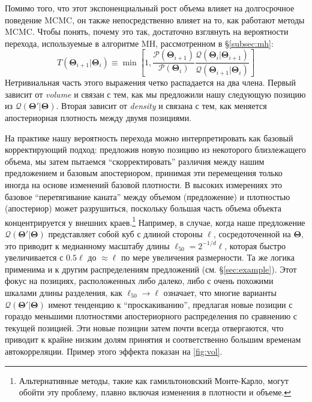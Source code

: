 \documentclass[12pt, titlepage]{article}
\newcommand{\params}{\ensuremath{\boldsymbol\Theta}}
\newcommand{\posterior}{\ensuremath{\mathcal{P}}}
\newcommand{\proposal}{\ensuremath{\mathcal{Q}}}
\begin{document}
Помимо того, что этот экспоненциальный рост объема влияет на долгосрочное поведение MCMC, он также непосредственно влияет на то, как работают методы MCMC. Чтобы понять, почему это так, достаточно взглянуть на вероятности перехода, используемые в алгоритме MH, рассмотренном в \S\ref{subsec:mh}:
\begin{equation*}
    T(\params_{i+1}|\params_i)
    \equiv \min\left[1, \frac{\posterior(\params_{i+1})}{\posterior(\params_i)}
    \frac{\proposal(\params_i|\params_{i+1})}{\proposal(\params_{i+1}|\params_i)}
    \right]
\end{equation*}
Нетривиальная часть этого выражения четко распадается на два члена. Первый зависит от \textit{volume} и связан с тем, как мы предложили нашу следующую позицию из $\proposal(\params'|\params)$. Вторая зависит от \textit{density} и связана с тем, как меняется апостериорная плотность между двумя позициями.

На практике нашу вероятность перехода можно интерпретировать как базовый корректирующий подход: предложив новую позицию из некоторого близлежащего объема, мы затем пытаемся ``скорректировать'' различия между нашим предложением и базовым апостериором, принимая эти перемещения только иногда на основе изменений базовой плотности. В высоких измерениях это базовое ``перетягивание каната'' между объемом (предложение) и плотностью (апостериор) может разрушиться, поскольку большая часть объема объекта концентрируется у внешних краев.\footnote{Альтернативные методы, такие как гамильтоновский Монте-Карло,\citep{neal12} могут обойти эту проблему, плавно включая изменения в плотности и объеме.} Например, в случае, когда наше предложение $\proposal(\params'|\params)$ представляет собой куб с длиной стороны $\ell$, сосредоточенной на $\params$, это приводит к медианному масштабу длины $\ell_{50} = 2^{-1/d} \ell$, которая быстро увеличивается с $0.5 \ell$ до $\approx \ell$ по мере увеличения размерности. Та же логика применима и к другим распределениям предложений (см. \S\ref{sec:example}). Этот фокус на позициях, расположенных либо далеко, либо с очень похожими шкалами длины разделения, как $\ell_{50} \rightarrow \ell$ означает, что многие варианты $\proposal(\params'|\params)$ имеют тенденцию к ``проскакиванию'', предлагая новые позиции с гораздо меньшими плотностями апостериорного распределения по сравнению с текущей позицией. Эти новые позиции затем почти всегда отвергаются, что приводит к крайне низким долям принятия и соответственно большим временам автокорреляции. Пример этого эффекта показан на {\color{red} \autoref{fig:vol}}.
\end{document}

